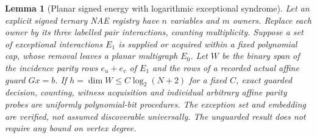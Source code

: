 \documentclass[11pt]{article}
\newtheorem{lemma}[theorem]{Lemma}
\begin{document}
\begin{lemma}[Planar signed energy with logarithmic exceptional syndrome]\label{lem:ba16-planar}
Let an explicit signed ternary NAE registry have $n$ variables and $m$ owners. Replace each owner by its three labelled pair interactions, counting multiplicity. Suppose a set of exceptional interactions $E_1$ is supplied or acquired within a fixed polynomial cap, whose removal leaves a planar multigraph $E_0$. Let $W$ be the binary span of the incidence parity rows $e_u+e_v$ of $E_1$ and the rows of a recorded actual affine guard $Gx=b$. If $h=\dim W\le C\log_2(N+2)$ for a fixed $C$, exact guarded decision, counting, witness acquisition and individual arbitrary affine parity probes are uniformly polynomial-bit procedures. The exception set and embedding are verified, not assumed discoverable universally. The unguarded result does not require any bound on vertex degree.
\end{lemma}
\end{document}
